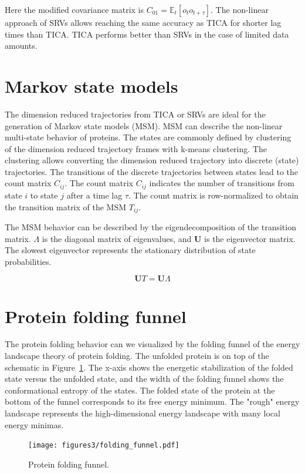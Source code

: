 Here the modified covariance matrix is $C_{01}=\ensuremath{\mathbb{E}}_{t}\left[o_{t}o_{t+\tau}\right]$.
The non-linear approach of SRVs allows reaching the same accuracy as TICA for shorter lag times than TICA. TICA performs better than SRVs in the case of limited data amounts.

\section{Markov state models}

The dimension reduced trajectories from TICA or SRVs are ideal for the generation of Markov state models (MSM)\cite{Noe2015}. MSM can describe the non-linear multi-state behavior of proteins. The states are commonly defined by clustering of the dimension reduced trajectory frames with k-means clustering. The clustering allows converting the dimension reduced trajectory into discrete (state) trajectories. The transitions of the discrete trajectories between states lead to the count matrix $C_{ij}$. The count matrix $C_{ij}$ indicates the number of transitions from state $i$ to state $j$ after a time lag $\tau$. The count matrix is row-normalized to obtain the transition matrix of the MSM $T_{ij}$.

The MSM behavior can be described by the eigendecomposition of the transition matrix. $\varLambda$ is the diagonal matrix of eigenvalues, and $\mathbf{U}$ is the eigenvector matrix. The slowest eigenvector represents the stationary distribution of state probabilities.

$$\mathbf{U}T=\mathbf{U}\varLambda$$


\section{Protein folding funnel}

The protein folding behavior can we visualized by the folding funnel of the energy landscape theory of protein folding\cite{bryngelson1995p}. The unfolded protein is on top of the schematic in Figure~\ref{fig:funnel}. The x-axis shows the energetic stabilization of the folded state versus the unfolded state, and the width of the folding funnel shows the conformational entropy of the states.  The folded state of the protein at the bottom of the funnel corresponds to its free energy minimum. The "rough" energy landscape represents the high-dimensional energy landscape with many local energy minimas.

\begin{figure}[H]
  \centering
  \texttt{[image: figures3/folding\_funnel.pdf]}
  \caption{Protein folding funnel.}
  \label{fig:funnel}
\end{figure}



